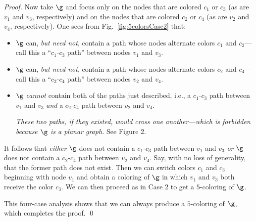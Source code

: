 \begin{proof}
Now take $\g$ and focus only on the nodes that are colored $c_1$ or
$c_3$ (as are $v_1$ and $v_3$, respectively) and on the nodes that are
colored $c_2$ or $c_4$ (as are $v_2$ and $v_4$, respectively).  One
sees from Fig.~\ref{fig:5colorsCase2} that:
\begin{itemize}
\item
$\g$ can, {\em but need not}, contain a path whose nodes alternate
  colors $c_1$ and $c_3$---call this a ``$c_1$-$c_3$ path'' between
  nodes $v_1$ and $v_3$.
\item
$\g$ can, {\em but need not}, contain a path whose nodes alternate
  colors $c_2$ and $c_4$---call this a ``$c_2$-$c_4$ path'' between
  nodes $v_2$ and $v_4$.
\item
$\g$ {\em cannot} contain both of the paths just described, i.e., a
  $c_1$-$c_3$ path between $v_1$ and $v_3$ {\em and} a $c_2$-$c_4$ path
  between $v_2$ and $v_4$.

{\em These two paths, if they existed, would cross one another---which
  is forbidden because $\g$ is a {\em planar} graph.}  See Figure 2.
\end{itemize}
It follows that {\em either} $\g$ does not contain a $c_1$-$c_3$ path
between $v_1$ and $v_3$ {\em or} $\g$ does not contain a $c_2$-$c_4$
path between $v_2$ and $v_4$.  Say, with no loss of generality, that
the former path does not exist.  Then we can switch colors $c_1$ and
$c_3$ beginning with node $v_1$ and obtain a coloring of $\g$ in which
$v_1$ and $v_3$ both receive the color $c_3$.  We can then proceed as
in Case 2 to get a $5$-coloring of $\g$.

This four-case analysis shows that we can always produce a
$5$-coloring of $\g$, which completes the proof.  \qed
\end{proof}
